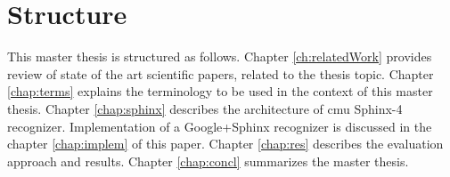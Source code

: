 \section {Structure}
This master thesis is structured as follows. Chapter \ref{ch:relatedWork}
provides review of state of the art scientific papers, related to the thesis
topic. Chapter \ref{chap:terms} explains the terminology to be used in the
context of this master thesis.  Chapter \ref{chap:sphinx} describes the
architecture of cmu Sphinx-4 recognizer. Implementation of a Google+Sphinx recognizer is discussed in the
chapter \ref{chap:implem} of this paper. Chapter \ref{chap:res} describes the
evaluation approach and results. Chapter \ref{chap:concl} summarizes the master
thesis.
